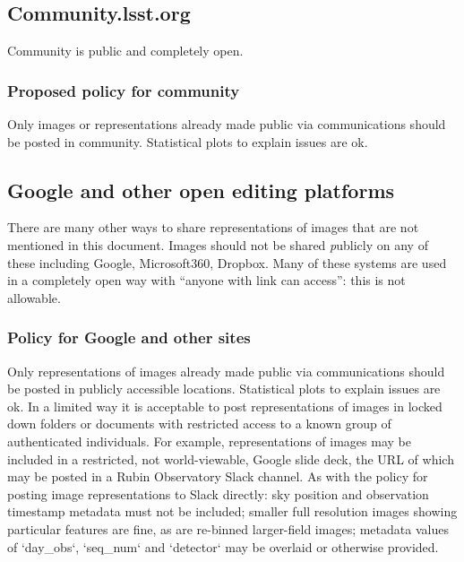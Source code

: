 \subsection{Community.lsst.org}
Community is public and completely open.
\subsubsection{Proposed policy for community}
Only images or representations already made public via communications should be posted in community.
Statistical plots to explain issues are ok.

\subsection{Google and other open editing platforms}
There are many other ways to share representations of images that are not mentioned in this document.
Images should not be shared {\emph publicly} on any of these including Google, Microsoft360, Dropbox.
Many of these systems are used in a completely open way with ``anyone with link can access'': this is not allowable.

\subsubsection{Policy for Google and other sites}
Only representations of images already made public via communications should be posted in publicly accessible locations.
Statistical plots to explain issues are ok.
In a limited way it is acceptable to post representations of images in locked down folders or documents with restricted access to a known group of authenticated individuals.
For example, representations of images may be included in a restricted, not world-viewable, Google slide deck, the URL of which may be posted in a Rubin Observatory Slack channel.
As with the policy for posting image representations to Slack directly:
sky position and observation timestamp metadata must not be included;
smaller full resolution images showing particular features are fine, as are re-binned larger-field images;
metadata values of `day\_obs`, `seq\_num` and `detector` may be overlaid or otherwise provided.


